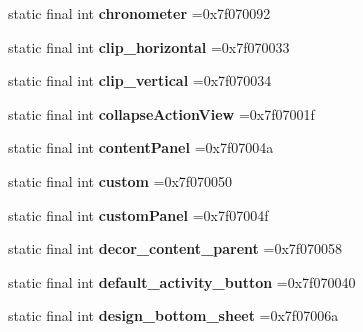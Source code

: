 \begin{DoxyCompactItemize}
static final int {\bfseries chronometer} =0x7f070092
\item 
\mbox{\label{classproject4_1_1xaria_1_1R_1_1id_aecdab7d82ead6d900a960490dffa6ed6}} 
static final int {\bfseries clip\+\_\+horizontal} =0x7f070033
\item 
\mbox{\label{classproject4_1_1xaria_1_1R_1_1id_a7b9b6d427893a91332f578b6989f139f}} 
static final int {\bfseries clip\+\_\+vertical} =0x7f070034
\item 
\mbox{\label{classproject4_1_1xaria_1_1R_1_1id_aaab216a82d59f67fed11ea680edff902}} 
static final int {\bfseries collapse\+Action\+View} =0x7f07001f
\item 
\mbox{\label{classproject4_1_1xaria_1_1R_1_1id_a102c4cd6f4e13d35fb0eabaf7e8b542a}} 
static final int {\bfseries content\+Panel} =0x7f07004a
\item 
\mbox{\label{classproject4_1_1xaria_1_1R_1_1id_a56a1d6a83d1d2cc09d36b3f19b72039d}} 
static final int {\bfseries custom} =0x7f070050
\item 
\mbox{\label{classproject4_1_1xaria_1_1R_1_1id_a2bdd48edac346fed9f586aca2dfbe1e4}} 
static final int {\bfseries custom\+Panel} =0x7f07004f
\item 
\mbox{\label{classproject4_1_1xaria_1_1R_1_1id_a5cab35ff19be83445728ace916a71302}} 
static final int {\bfseries decor\+\_\+content\+\_\+parent} =0x7f070058
\item 
\mbox{\label{classproject4_1_1xaria_1_1R_1_1id_ad282553c9655afed720916dc95423d90}} 
static final int {\bfseries default\+\_\+activity\+\_\+button} =0x7f070040
\item 
\mbox{\label{classproject4_1_1xaria_1_1R_1_1id_a43f7c4b3e7fa691912dc685927e063f1}} 
static final int {\bfseries design\+\_\+bottom\+\_\+sheet} =0x7f07006a
\item 
\mbox{\label{classproject4_1_1xaria_1_1R_1_1id_a5b722c5310a66781dfc262a5144f795c}} 

\end{DoxyCompactItemize}
